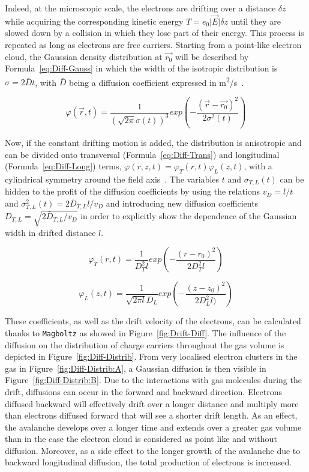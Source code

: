 	Indeed, at the microscopic scale, the electrons are drifting over a distance $\delta z$ while acquiring the corresponding kinetic energy $T = e_0 \vert\overrightarrow{E}\vert\delta z$ until they are slowed down by a collision in which they lose part of their energy. This process is repeated as long as electrons are free carriers. Starting from a point-like electron cloud, the Gaussian density distribution at $\overrightarrow{r_0}$ will be described by Formula~\ref{eq:Diff-Gauss} in which the width of the isotropic distribution is $\sigma = 2\bar{D}t$, with $\bar{D}$ being a diffusion coefficient expressed in \si{m^2/s}~\cite{LIPPMANN2003}.
	
	\begin{equation}
	\label{eq:Diff-Gauss}
	\varphi(\overrightarrow{r},t) = \frac{1}{\left(\sqrt{2\pi}\sigma(t)\right)^3} exp\left( -\frac{(\overrightarrow{r} - \overrightarrow{r_0})^2}{2\sigma^2(t)} \right)
	\end{equation}
	
	Now, if the constant drifting motion is added, the distribution is anisotropic and can be divided onto transversal (Formula~\ref{eq:Diff-Trans}) and longitudinal (Formula~\ref{eq:Diff-Long}) terms, $\varphi(r,z,t) = \varphi_T(r,t)\varphi_L(z,t)$, with a cylindrical symmetry around the field axis~\cite{LIPPMANN2003}. The variables $t$ and $\sigma_{T,L}(t)$ can be hidden to the profit of the diffusion coefficients by using the relations $v_D = l/t$ and $\sigma_{T,L}^2(t) = 2\bar{D}_{T,L}l/v_D$ and introducing new diffusion coefficients $D_{T,L} = \sqrt{2\bar{D}_{T,L}/v_D}$ in order to explicitly show the dependence of the Gaussian width in drifted distance $l$.
	
	\begin{equation}
	\label{eq:Diff-Trans}
	\varphi_T(r,t) = \frac{1}{D_T^2l} exp\left( -\frac{(r - r_0)^2}{2D_T^2l} \right)
	\end{equation}
	
	\begin{equation}
	\label{eq:Diff-Long}
	\varphi_L(z,t) = \frac{1}{\sqrt{2\pi l}D_L} exp\left( -\frac{(z - z_0)^2}{2D_L^2l)} \right)
	\end{equation}
	
	These coefficients, as well as the drift velocity of the electrons, can be calculated thanks to \texttt{Magboltz} as showed in Figure~\ref{fig:Drift-Diff}. The influence of the diffusion on the distribution of charge carriers throughout the gas volume is depicted in Figure~\ref{fig:Diff-Distrib}. From very localised electron clusters in the gas in Figure~\ref{fig:Diff-Distrib:A}, a Gaussian diffusion is then visible in Figure~\ref{fig:Diff-Distrib:B}. Due to the interactions with gas molecules during the drift, diffusions can occur in the forward and backward direction. Electrons diffused backward will effectively drift over a longer distance and multiply more than electrons diffused forward that will see a shorter drift length. As an effect, the avalanche develops over a longer time and extends over a greater gas volume than in the case the electron cloud is considered as point like and without diffusion. Moreover, as a side effect to the longer growth of the avalanche due to backward longitudinal diffusion, the total production of electrons is increased.
	
